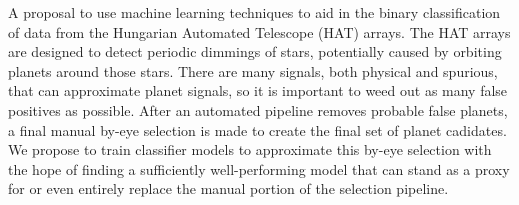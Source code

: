 A proposal to use machine learning techniques to aid in the binary classification of data from the Hungarian Automated Telescope (HAT) arrays.  The HAT arrays are designed to detect periodic dimmings of stars, potentially caused by orbiting planets around those stars.  There are many signals, both physical and spurious, that can approximate planet signals, so it is important to weed out as many false positives as possible.  After an automated pipeline removes probable false planets, a final manual by-eye selection is made to create the final set of planet cadidates.  We propose to train classifier models to approximate this by-eye selection with the hope of finding a sufficiently well-performing model that can stand as a proxy for or even entirely replace the manual portion of the selection pipeline.